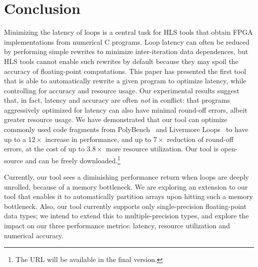 \section{Conclusion}
\label{sec:conclusion}

Minimizing the latency of loops is a central task for HLS tools that obtain
FPGA implementations from numerical C programs. Loop latency can often be
reduced by performing simple rewrites to minimize inter-iteration data
dependences, but HLS tools cannot enable such rewrites by default because
they may spoil the accuracy of floating-point computations. This paper has
presented the first tool that is able to automatically rewrite a given program
to optimize latency, while controlling for accuracy and resource usage. Our
experimental results suggest that, in fact, latency and accuracy are often
\emph{not} in conflict: that programs aggressively optimized for latency can
also have minimal round-off errors, albeit greater resource usage. We have
demonstrated that our tool can optimize commonly used code fragments from
PolyBench~\cite{polybench} and Livermore Loops~\cite{livermore} to have up to a
$12\times$ increase in performance, and up to $7\times$ reduction of round-off
errors, at the cost of up to $3.8\times$ more resource utilization.  Our tool
is open-source and can be freely downloaded.\footnote{The URL will be available
in the final version.} %

Currently, our tool sees a diminishing performance return when loops are deeply
unrolled, because of a memory bottleneck. We are exploring an extension to
our tool that enables it to automatically partition arrays upon hitting such
a memory bottleneck. Also, our tool currently supports only single-precision
floating-point data types; we intend to extend this to multiple-precision
types, and explore the impact on our three performance metrics: latency,
resource utilization and numerical accuracy.

